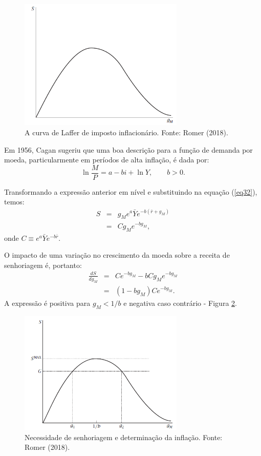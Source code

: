 \documentclass[preprintnumbers,nofootinbib,amsmath,amssymb,12pt]{article}
\begin{document}
\begin{figure}[h!]
    \centering
    \includegraphics[width=0.7\textwidth]{./figures/aula6_fig3.PNG}
    \caption{A curva de Laffer de imposto inflacionário. Fonte: Romer (2018).}
    \label{fig3}
\end{figure}

Em 1956, Cagan sugeriu que uma boa descrição para a função de demanda por moeda, particularmente em períodos de alta inflação, é dada por:
\begin{equation}
    \ln \frac{M}{P} = a - bi + \ln Y, \qquad b > 0.
    \label{eq34}
\end{equation}

Transformando a expressão anterior em nível e substituindo na equação (\ref{eq32}), temos:
\begin{eqnarray}
S &=& g_M e^a\bar{Y}e^{-b(\bar{r} + g_M)} \nonumber \\
&=& C g_M e^{-bg_M}, \label{eq35}
\end{eqnarray}
onde $C \equiv e^a\bar{Y}e^{-b\bar{r}}$.

O impacto de uma variação no crescimento da moeda sobre a receita de senhoriagem é, portanto:
\begin{eqnarray}
    \frac{dS}{dg_M} &=& Ce^{-bg_M} - bCg_Me^{-bg_M} \nonumber \\
    &=& (1-bg_M)Ce^{-bg_M}. \label{eq36}
\end{eqnarray}
A expressão é positiva para $g_M<1/b$ e negativa caso contrário - Figura \ref{fig4}.

\begin{figure}[h!]
    \centering
    \includegraphics[width=0.7\textwidth]{./figures/aula6_fig4.PNG}
    \caption{Necessidade de senhoriagem e determinação da inflação. Fonte: Romer (2018).}
    \label{fig4}
\end{figure}
\end{document}
